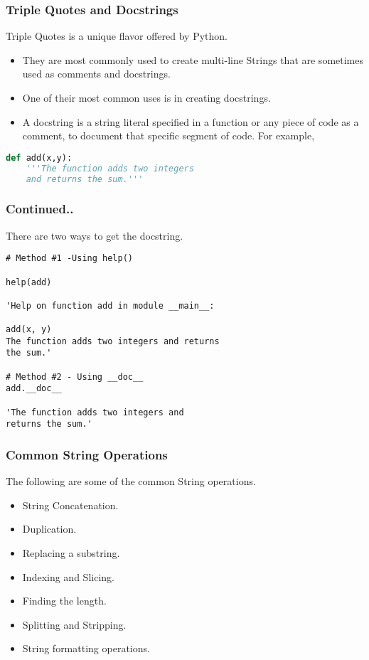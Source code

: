 \documentclass{beamer}
\begin{document}
\begin{frame}[fragile]
\frametitle{Triple Quotes and Docstrings}
Triple Quotes is a unique flavor offered by Python.
\begin{itemize}
\item They are most commonly used to create multi-line Strings that are sometimes used as comments and docstrings.
\item One of their most common uses is in creating docstrings.
\item A docstring is a string literal specified in a function or any piece of code as a comment, to document that specific segment of code. For example,
 
\end{itemize}

\begin{lstlisting}[language=Python]
def add(x,y):
	'''The function adds two integers
	and returns the sum.'''
\end{lstlisting}
\end{frame}

\begin{frame}[fragile]
\frametitle{Continued..}
There are two ways to get the docstring.

\begin{lstlisting}
# Method #1 -Using help()

help(add)

'Help on function add in module __main__:

add(x, y)
The function adds two integers and returns 
the sum.'

# Method #2 - Using __doc__	
add.__doc__

'The function adds two integers and 
returns the sum.'
\end{lstlisting}
\end{frame}

\begin{frame}
\frametitle{Common String Operations}
The following are some of the common String operations.
\begin{itemize}
\item String Concatenation.
\item Duplication.
\item Replacing a substring.
\item Indexing and Slicing.
\item Finding the length.
\item Splitting and Stripping.
\item String formatting operations.
\end{itemize}
\end{frame}
\end{document}
